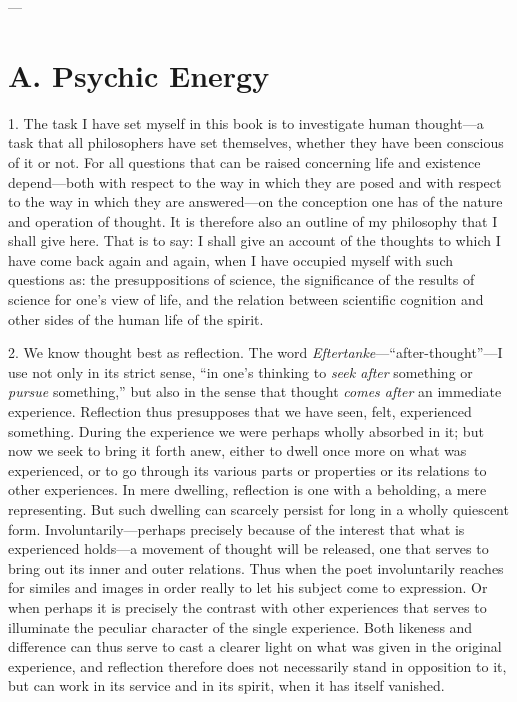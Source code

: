 \documentclass[12pt,a4paper]{book}
\newcommand{\opage}[1]{\marginnote{\footnotesize\textit{[#1]}}}
\begin{document}
\begin{center}---\end{center}

\section*{A. Psychic Energy}
\label{sec:psykisk-energi}

\noindent \opage{1}1. The task I have set myself in this book is to investigate
human thought---a task that all philosophers have set themselves,
whether they have been conscious of it or not. For all questions that
can be raised concerning life and existence depend---both with respect
to the way in which they are posed and with respect to the way in which
they are answered---on the conception one has of the nature and
operation of thought. It is therefore also an outline of my philosophy
that I shall give here. That is to say: I shall give an account of the
thoughts to which I have come back again and again, when I have occupied
myself with such questions as: the presuppositions of science, the
significance of the results of science for one's view of life, and the
relation between scientific cognition and other sides of the human life
of the spirit.

2. We know thought best as reflection. The word \emph{Eftertanke}---``after-thought''---I
use not only in its strict sense, ``in one's thinking to \emph{seek
after} something or \emph{pursue} something,'' but also in the sense
that thought \emph{comes after} an immediate experience. Reflection thus
presupposes that we have seen, felt, experienced something. During the
experience we were perhaps wholly absorbed in it; but now we seek to
bring it forth anew, either to dwell once more on what was experienced,
or to go through its various parts or properties or its relations to
other experiences. In mere dwelling, reflection is one with a beholding,
a mere representing. But such dwelling \opage{2}can scarcely persist for long in a
wholly quiescent form. Involuntarily---perhaps precisely because of the
interest that what is experienced holds---a movement of thought will be
released, one that serves to bring out its inner and outer relations.
Thus when the poet involuntarily reaches for similes and images in order
really to let his subject come to expression. Or when perhaps it is
precisely the contrast with other experiences that serves to illuminate
the peculiar character of the single experience. Both likeness and
difference can thus serve to cast a clearer light on what was given in
the original experience, and reflection therefore does not necessarily
stand in opposition to it, but can work in its service and in its
spirit, when it has itself vanished.
\end{document}
